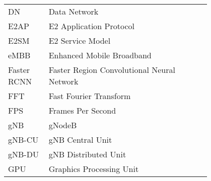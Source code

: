 \begin{flushleft}
\begin{tabular}{l p{0.8\linewidth}}
        DN & Data Network \\
        E2AP & E2 Application Protocol \\
        E2SM & E2 Service Model \\
        eMBB & Enhanced Mobile Broadband \\
        Faster RCNN & Faster Region Convolutional Neural Network \\
        FFT & Fast Fourier Transform \\
        FPS & Frames Per Second \\
        gNB & gNodeB \\
        gNB-CU & gNB Central Unit \\
        gNB-DU & gNB Distributed Unit \\
        GPU & Graphics Processing Unit \\
    \end{tabular}
\end{flushleft}
